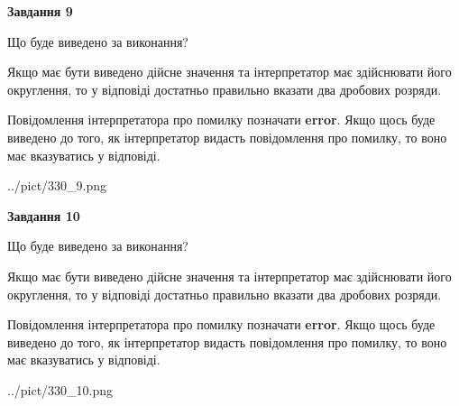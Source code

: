 \documentclass[12pt, ukrainian]{article}
\begin{document}
{\begin {Large}
{\begin {center}\textbf{Завдання 9}\end {center}}\par
Що буде виведено за виконання? \par

Якщо має бути виведено дійсне значення та інтерпретатор має здійснювати його округлення, 
то у відповіді достатньо правильно вказати два дробових розряди.

Повідомлення інтерпретатора про помилку позначати \textbf{error}.
Якщо щось буде виведено до того, як інтерпретатор видасть повідомлення про помилку, 
то воно має вказуватись у відповіді. \par

\begin{center}
	{../pict/330_9.png}
\end{center}
\newpage

{\begin {center}\textbf{Завдання 10}\end {center}}\par
Що буде виведено за виконання? \par

Якщо має бути виведено дійсне значення та інтерпретатор має здійснювати його округлення, 
то у відповіді достатньо правильно вказати два дробових розряди.

Повідомлення інтерпретатора про помилку позначати \textbf{error}.
Якщо щось буде виведено до того, як інтерпретатор видасть повідомлення про помилку, 
то воно має вказуватись у відповіді. \par

\begin{center}
	{../pict/330_10.png}
\end{center}
\newpage

\end {Large}}
\end{document}
